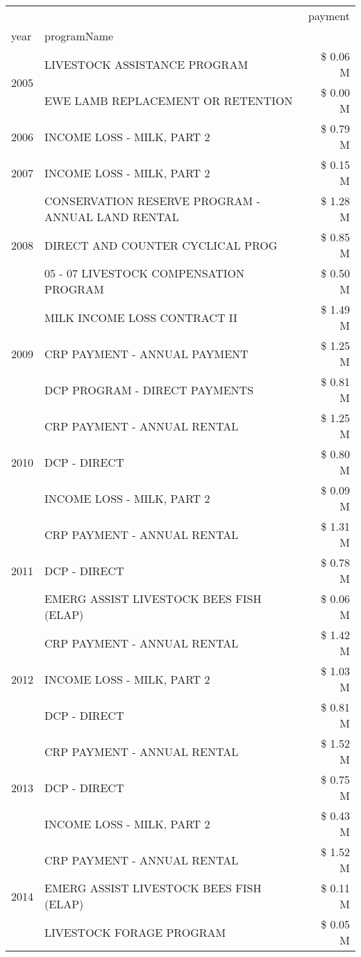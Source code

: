 \begin{tabular}{llr}
\toprule
 &  & payment \\
year & programName &  \\
\midrule
\multirow[t]{2}{*}{2005} & LIVESTOCK ASSISTANCE PROGRAM & \$ 0.06 M \\
 & EWE LAMB REPLACEMENT OR RETENTION & \$ 0.00 M \\
\cline{1-3}
2006 & INCOME LOSS - MILK, PART 2 & \$ 0.79 M \\
\cline{1-3}
2007 & INCOME LOSS - MILK, PART 2 & \$ 0.15 M \\
\cline{1-3}
\multirow[t]{3}{*}{2008} & CONSERVATION RESERVE PROGRAM - ANNUAL LAND RENTAL & \$ 1.28 M \\
 & DIRECT AND COUNTER CYCLICAL PROG & \$ 0.85 M \\
 & 05 - 07 LIVESTOCK COMPENSATION PROGRAM & \$ 0.50 M \\
\cline{1-3}
\multirow[t]{3}{*}{2009} & MILK INCOME LOSS CONTRACT II & \$ 1.49 M \\
 & CRP PAYMENT - ANNUAL PAYMENT & \$ 1.25 M \\
 & DCP PROGRAM - DIRECT PAYMENTS & \$ 0.81 M \\
\cline{1-3}
\multirow[t]{3}{*}{2010} & CRP PAYMENT - ANNUAL RENTAL & \$ 1.25 M \\
 & DCP - DIRECT & \$ 0.80 M \\
 & INCOME LOSS - MILK, PART 2 & \$ 0.09 M \\
\cline{1-3}
\multirow[t]{3}{*}{2011} & CRP PAYMENT - ANNUAL RENTAL & \$ 1.31 M \\
 & DCP - DIRECT & \$ 0.78 M \\
 & EMERG ASSIST LIVESTOCK BEES FISH (ELAP) & \$ 0.06 M \\
\cline{1-3}
\multirow[t]{3}{*}{2012} & CRP PAYMENT - ANNUAL RENTAL & \$ 1.42 M \\
 & INCOME LOSS - MILK, PART 2 & \$ 1.03 M \\
 & DCP - DIRECT & \$ 0.81 M \\
\cline{1-3}
\multirow[t]{3}{*}{2013} & CRP PAYMENT - ANNUAL RENTAL & \$ 1.52 M \\
 & DCP - DIRECT & \$ 0.75 M \\
 & INCOME LOSS - MILK, PART 2 & \$ 0.43 M \\
\cline{1-3}
\multirow[t]{3}{*}{2014} & CRP PAYMENT - ANNUAL RENTAL & \$ 1.52 M \\
 & EMERG ASSIST LIVESTOCK BEES FISH (ELAP) & \$ 0.11 M \\
 & LIVESTOCK FORAGE PROGRAM & \$ 0.05 M \\

\end{tabular}
